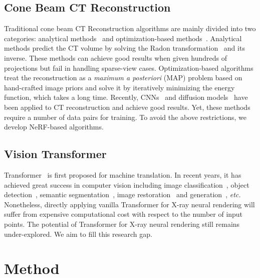 \documentclass[10pt,twocolumn,letterpaper]{article}
\begin{document}
\subsection{Cone Beam CT Reconstruction}
Traditional cone beam CT Reconstruction algorithms are mainly divided into two categories: analytical methods~\cite{fdk,analytical_2} and optimization-based methods~\cite{asd_pocs,sart,vw_art,iterative_1,iterative_2,iterative_3}. Analytical methods predict the CT volume by solving the Radon transformation~\cite{radon} and its inverse. 
These methods can achieve good results when given hundreds of projections but fail in handling sparse-view cases. Optimization-based algorithms treat the reconstruction as a \emph{maximum a posteriori} (MAP) problem based on hand-crafted image priors and solve it by iteratively minimizing the energy function, which takes a long time. 
Recently, CNNs~\cite{x2ct,dif_net,ctnet,ct_transfer,intratomo} and diffusion models~\cite{diffusion_mbir} have been applied to CT reconstruction and achieve good results. 
Yet, these methods require a number of data pairs for training. 
To avoid the above restrictions, we develop NeRF-based algorithms. 



\subsection{Vision Transformer}
Transformer~\cite{vaswani2017attention} is first proposed for machine translation. In recent years, it has achieved great success in computer vision including image classification~\cite{xcit,arnab2021vivit,global_msa}, object detection~\cite{to_2,de_detr,DETR}, semantic segmentation~\cite{SETR,segformer,ts_1}, image restoration~\cite{restormer,retinexformer,dauhst,mst} and generation~\cite{styleswin,gat,transgan}, \emph{etc.} Nonetheless, directly applying vanilla Transformer for X-ray neural rendering will suffer from expensive computational cost with respect to the number of input points. The potential of Transformer for X-ray neural rendering still remains under-explored. We aim to fill this research gap.

\section{Method}
\label{sec:method}
\end{document}
